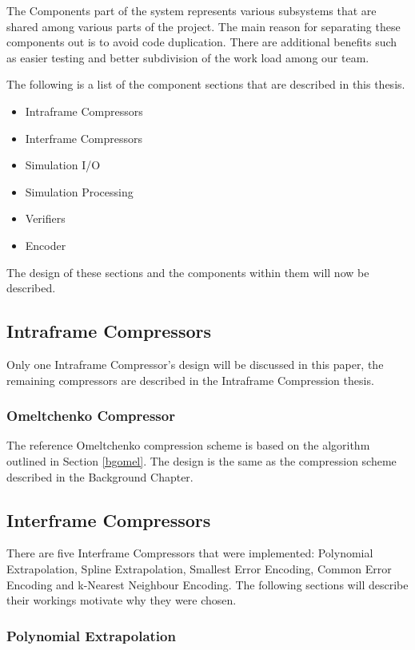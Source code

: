 \documentclass[a4paper,11pt]{report}
\begin{document}
The Components part of the system represents various subsystems that are shared among various parts of the project. The main reason for separating these components out is to avoid code duplication. There are additional benefits such as easier testing and better subdivision of the work load among our team.

The following is a list of the component sections that are described in this thesis.
\begin{itemize}
 \item Intraframe Compressors
 \item Interframe Compressors
 \item Simulation I/O
 \item Simulation Processing
 \item Verifiers
 \item Encoder
\end{itemize}

The design of these sections and the components within them will now be described.

\subsection{Intraframe Compressors}

Only one Intraframe Compressor's design will be discussed in this paper, the remaining compressors are described in the Intraframe Compression thesis. 

\subsubsection{Omeltchenko Compressor}

The reference Omeltchenko compression scheme is based on the algorithm outlined in Section \ref{bgomel}. The design is the same as the compression scheme described in the Background Chapter.

\subsection{Interframe Compressors}

There are five Interframe Compressors that were implemented: Polynomial Extrapolation, Spline Extrapolation, Smallest Error Encoding, Common Error Encoding and k-Nearest Neighbour Encoding. The following sections will describe their workings motivate why they were chosen.

\subsubsection{Polynomial Extrapolation}
\end{document}
